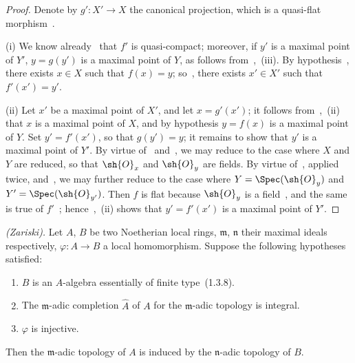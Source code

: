 \begin{proof}
Denote by $g':X'\to X$ the canonical projection, which is a quasi-flat morphism~.

(i) We know already~ that $f'$ is quasi-compact; moreover, if $y'$ is a maximal point of $Y'$, $y=g(y')$ is a maximal point of $Y$, as follows from~,~(iii).
By hypothesis~, there exists $x\in X$ such that $f(x)=y$; so~, there exists $x'\in X'$ such that $f'(x')=y'$.

(ii) Let $x'$ be a maximal point of $X'$, and let $x=g'(x')$; it follows from~,~(ii) that $x$ is a maximal point of $X$, and by hypothesis $y=f(x)$ is a maximal point of $Y$.
Set $y'=f'(x')$, so that $g(y')=y$; it remains to show that $y'$ is a maximal point of $Y'$.
By virtue of~ and~, we may reduce to the case where $X$ and $Y$ are reduced, so that $\sh{O}_x$ and $\sh{O}_y$ are fields.
By virtue of~, applied twice, and~, we may further reduce to the case where $Y=\Spec(\sh{O}_y)$ and $Y'=\Spec(\sh{O}_{y'})$.
Then $f$ is flat because $\sh{O}_y$ is a field~, and the same is true of $f'$~; hence~,~(ii) shows that $y'=f'(x')$ is a maximal point of $Y'$.
\end{proof}

\begin{corollary}[2.3.8]
\label{IV.2.3.8}
\emph{(Zariski).}
Let $A$, $B$ be two Noetherian local rings, $\mathfrak{m}$, $\mathfrak{n}$ their maximal ideals respectively, $\varphi:A\to B$ a local homomorphism. Suppose the following hypotheses satisfied:
\begin{enumerate}
  \item[$1^\circ$] $B$ is an $A$-algebra essentially of finite type~(1.3.8).
  \item[$2^\circ$] The $\mathfrak{m}$-adic completion $\widehat{A}$ of $A$ for the $\mathfrak{m}$-adic topology is integral.
  \item[$3^\circ$] $\varphi$ is injective.
\end{enumerate}
Then the $\mathfrak{m}$-adic topology of $A$ is induced by the $\mathfrak{n}$-adic topology of $B$.
\end{corollary}

